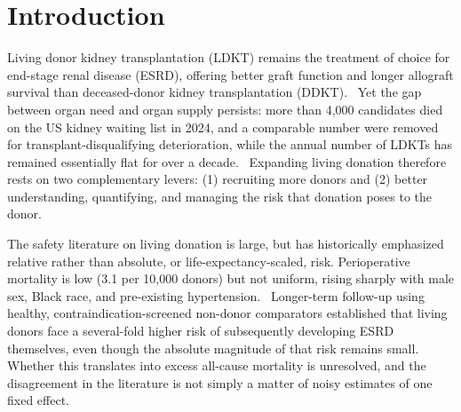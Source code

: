 \section{Introduction}
\label{sec:intro}
Living donor kidney transplantation (LDKT) remains the treatment of choice for end-stage renal disease (ESRD), offering better graft function and longer allograft survival than deceased-donor kidney transplantation (DDKT).~\cite{srtr_2023} Yet the gap between organ need and organ supply persists: more than 4,000 candidates died on the US kidney waiting list in 2024, and a comparable number were removed for transplant-disqualifying deterioration, while the annual number of LDKTs has remained essentially flat for over a decade.~\cite{cooper_100-year_2026} Expanding living donation therefore rests on two complementary levers: (1) recruiting more donors and (2) better understanding, quantifying, and managing the risk that donation poses to the donor.

The safety literature on living donation is large, but has historically emphasized relative rather than absolute, or life-expectancy-scaled, risk. Perioperative mortality is low (3.1 per 10,000 donors) but not uniform, rising sharply with male sex, Black race, and pre-existing hypertension.~\cite{segev_perioperative_2010} Longer-term follow-up using healthy, contraindication-screened non-donor comparators established that living donors face a several-fold higher risk of subsequently developing ESRD themselves, even though the absolute magnitude of that risk remains small.~\cite{muzaale_risk_2014, massie_quantifying_2017} Whether this translates into excess all-cause mortality is unresolved, and the disagreement in the literature is not simply a matter of noisy estimates of one fixed effect. 

